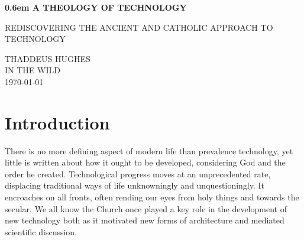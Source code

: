 \documentclass[letterpaper]{article}
\begin{document}
\clearpage
\newcommand\nbvspace[1][3]{\vspace*{\stretch{#1}}}

\newcommand{\nbstretchyspace}{\spaceskip0.5em plus 0.25em minus 0.25em}

\newcommand{\nbtitlestretch}{\spaceskip0.6em}

\pagestyle{plain}
\begin{center}
  \bfseries
  \nbvspace[1]
  \Huge
  {\nbtitlestretch\huge
    A THEOLOGY OF TECHNOLOGY}

  \nbvspace[1]
  \normalsize
  REDISCOVERING THE ANCIENT AND CATHOLIC APPROACH TO TECHNOLOGY\\

  \nbvspace[1]
  \nbvspace[2]

  \nbvspace[3]
  \normalsize
  
  \Large THADDEUS HUGHES\\


  \large
  IN THE WILD \\
  \small \MakeUppercase{\today} \\
\end{center}

\raggedbottom
\tableofcontents

\newpage


\section{Introduction}

There is no more defining aspect of modern life than prevalence technology, yet little is written about how it ought to be developed, considering God and the order he created. Technological progress moves at an unprecedented rate, displacing traditional ways of life unknowningly and unquestioningly. It encroaches on all fronts, often rending our eyes from holy things and towards the secular. We all know the Church once played a key role in the development of new technology both as it motivated new forms of architecture and mediated scientific discussion.
\end{document}
